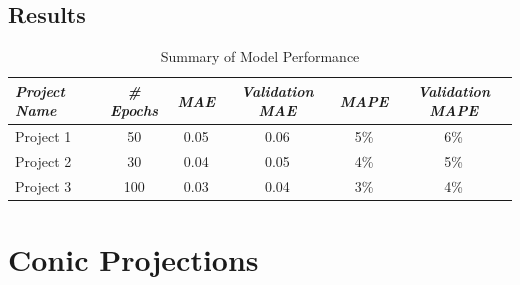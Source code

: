 \subsection{Results}
\begin{table}[ht]
    \centering
    \caption{Summary of Model Performance}
    \label{pseudo_cylindrical_results_table}
    \renewcommand{\arraystretch}{1.2} %
    \begin{tabular}{|l|c|c|c|c|c|}
        \hline
        \rowcolor[gray]{0.9}
        \textbf{\emph{Project Name}} & \textbf{\emph{\# Epochs}} & \textbf{\emph{MAE}} & \textbf{\emph{Validation MAE}} & \textbf{\emph{MAPE}} & \textbf{\emph{Validation MAPE}} \\ \hline
        Project 1                    & 50                        & 0.05                & 0.06                           & 5\%                  & 6\%                             \\ \hline
        Project 2                    & 30                        & 0.04                & 0.05                           & 4\%                  & 5\%                             \\ \hline
        Project 3                    & 100                       & 0.03                & 0.04                           & 3\%                  & 4\%                             \\ \hline
    \end{tabular}
\end{table}


\newpage
\section{Conic Projections}
